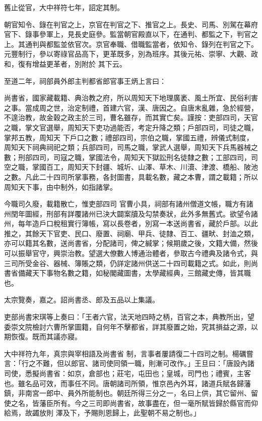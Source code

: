 \begin{pinyinscope}
 舊止從官，大中祥符七年，詔定其制。



 朝官知令、錄在判官之上，京官在判官之下、推官之上。長史、司馬、別駕在幕府官下、錄事參軍上，見長史庭參。監當朝官殿直以下，在通判、都監之下，判官之上。其通判與都監並依官次。京官奉職、借職監當者，依知令、錄列在判官之下。元豐制行，參以寄祿官品高下，更革既多，別為班序。其後元祐、崇寧、大觀、政和，復有增益更革者，別附於
 其下云。



 至道二年，祠部員外郎主判都省郎官事王炳上言曰：



 尚書省，國家藏載籍、典治教之府，所以周知天下地理廣袤、風土所宜、民俗利害之事。當成周之世，治定制禮，首建六官，漢、唐因之。自唐末亂雜，急於經營，不遑治教，故金穀之政主於三司，曹名雖存，而其實亡矣。謹按：吏部四司，天官之職，掌文官選舉，周知天下吏功過能否，考定升降之類；戶部四司，司徒之職，掌邦五教，周知天
 下戶口之數；禮部四司，宗伯之職，掌國五禮，辨儀式制度，周知天下祠典祠祀之類；兵部四司，司馬之職，掌武人選舉，周知天下兵馬器械之數；刑部四司，司寇之職，掌國法令，周知天下獄訟刑名徒隸之數；工部四司，司空之職，掌國百工，周知天下封疆、城圻、山澤、草木、川瀆、津渡、橋船、陂池之數。凡此二十四司所掌事務，各封圖書，具載名數，藏之本曹，謂之載籍；所以周知天下事，由中制外，如指諸掌。



 今職司久廢，載籍散亡，惟吏部四司
 官曹小具，祠部有諸州僧道文帳，職方有諸州閏年圖經，刑部有詳覆諸州已決大闢案牘及勾禁奏狀，此外多無舊式。欲望令諸州，每年造戶口稅租實行簿帳，寫以長卷者，別寫一本送尚書省，藏於戶部。以此推之，其餘天下官吏、民口、廢置、祠廟、甲兵、徒隸、百工、疆畎、封洫之類，亦可以籍其名數，送尚書省，分配諸司，俾之緘掌；候期歲之後，文籍大備，然後可以振舉官守，興崇治教。望選大僚數人博通治體者，參取古今禮典及諸令式，與
 三司所受金谷、器械、簿賬之類，仍詳定諸州供送二十四司載籍之式。如此，則尚書省備藏天下事物名數之籍，如秘閣藏圖書，太學藏經典，三館藏史傳，皆其職也。



 太宗覽奏，嘉之。詔尚書丞、郎及五品以上集議。



 吏部尚書宋琪等上奏曰：「王者六官，法天地四時之柄，百官之本，典教所出，望委崇文院檢討六曹所掌圖籍，自何年不擊都省，詳其廢置之始，究其損益之源，以期恢復。既而其議亦寢。



 大中祥符九年，真宗與宰相語及尚書省
 制，言事者屢請復二十四司之制。楊礪嘗言：「行之不難，但以郎官、諸司使同領一職，則漸可改作。」王旦曰：「唐設內諸司使，悉擬尚書省：如京，倉部也；莊宅，屯田也；皇城，司門也；禮賓，主客也。雖名品可效，而事任不同。唐朝諸司所領，惟京邑內外耳，諸道兵賦各歸藩鎮，非南宮一郎中、員外所能制也。朝廷所得三分之一，名曰上供，其它留州、留使之名，皆藩臣所有。今之三司即尚書省，故事盡在，但一毫所賦皆歸於縣官而仰給焉，故蠲放則
 澤及下，予賜則恩歸上，此聖朝不易之制也。」




\end{pinyinscope}
